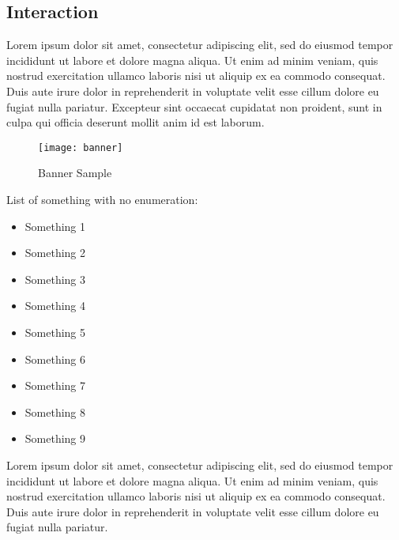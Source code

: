 \subsection{Interaction}

Lorem ipsum dolor sit amet, consectetur adipiscing elit, sed do eiusmod tempor incididunt ut labore et dolore magna aliqua. Ut enim ad minim veniam, quis nostrud exercitation ullamco laboris nisi ut aliquip ex ea commodo consequat. Duis aute irure dolor in reprehenderit in voluptate velit esse cillum dolore eu fugiat nulla pariatur. Excepteur sint occaecat cupidatat non proident, sunt in culpa qui officia deserunt mollit anim id est laborum.


\hfill

\begin{figure}[h]
\caption{Banner Sample}
\centering
\texttt{[image: banner]}
\end{figure}

\hfill


\hfill

List of something with no enumeration:

\hfill

\begin{itemize}
  \item Something 1
  \item Something 2
  \item Something 3
  \item Something 4
  \item Something 5
  \item Something 6
  \item Something 7
  \item Something 8
  \item Something 9
\end{itemize}

\hfill


Lorem ipsum dolor sit amet, consectetur adipiscing elit, sed do eiusmod tempor incididunt ut labore et dolore magna aliqua. Ut enim ad minim veniam, quis nostrud exercitation ullamco laboris nisi ut aliquip ex ea commodo consequat. Duis aute irure dolor in reprehenderit in voluptate velit esse cillum dolore eu fugiat nulla pariatur.